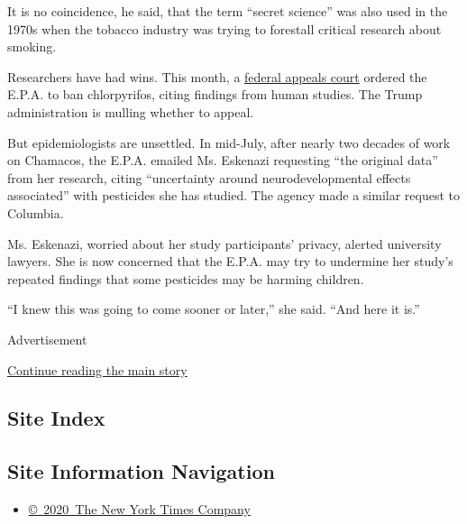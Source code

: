 It is no coincidence, he said, that the term ``secret science'' was also
used in the 1970s when the tobacco industry was trying to forestall
critical research about smoking.

Researchers have had wins. This month, a
\href{https://www.nytimes3xbfgragh.onion/2018/08/09/us/politics/chlorpyrifos-pesticide-ban-epa-court.html?rref=collection\%2Fbyline\%2Feric-lipton\&action=click\&contentCollection=undefined\&region=stream\&module=stream_unit\&version=latest\&contentPlacement=1\&pgtype=collection}{federal
appeals court} ordered the E.P.A. to ban chlorpyrifos, citing findings
from human studies. The Trump administration is mulling whether to
appeal.

But epidemiologists are unsettled. In mid-July, after nearly two decades
of work on Chamacos, the E.P.A. emailed Ms. Eskenazi requesting ``the
original data'' from her research, citing ``uncertainty around
neurodevelopmental effects associated'' with pesticides she has studied.
The agency made a similar request to Columbia.

Ms. Eskenazi, worried about her study participants' privacy, alerted
university lawyers. She is now concerned that the E.P.A. may try to
undermine her study's repeated findings that some pesticides may be
harming children.

``I knew this was going to come sooner or later,'' she said. ``And here
it is.''

Advertisement

\protect\hyperlink{after-bottom}{Continue reading the main story}

\hypertarget{site-index}{%
\subsection{Site Index}\label{site-index}}

\hypertarget{site-information-navigation}{%
\subsection{Site Information
Navigation}\label{site-information-navigation}}

\begin{itemize}
\tightlist
\item
  \href{https://help.nytimes3xbfgragh.onion/hc/en-us/articles/115014792127-Copyright-notice}{©~2020~The
  New York Times Company}
\end{itemize}

